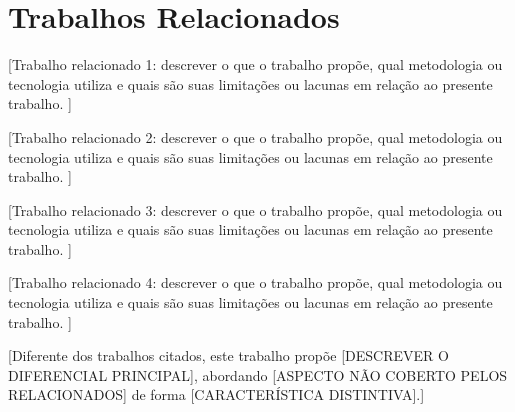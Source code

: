\section{Trabalhos Relacionados}
\label{sec:trabalhos}

[Trabalho relacionado 1: descrever o que o trabalho propõe, qual metodologia ou tecnologia
utiliza e quais são suas limitações ou lacunas em relação ao presente trabalho. \cite{rel1}]

[Trabalho relacionado 2: descrever o que o trabalho propõe, qual metodologia ou tecnologia
utiliza e quais são suas limitações ou lacunas em relação ao presente trabalho. \cite{rel2}]

[Trabalho relacionado 3: descrever o que o trabalho propõe, qual metodologia ou tecnologia
utiliza e quais são suas limitações ou lacunas em relação ao presente trabalho. \cite{rel3}]

[Trabalho relacionado 4: descrever o que o trabalho propõe, qual metodologia ou tecnologia
utiliza e quais são suas limitações ou lacunas em relação ao presente trabalho. \cite{rel4}]

[Diferente dos trabalhos citados, este trabalho propõe [DESCREVER O DIFERENCIAL PRINCIPAL],
abordando [ASPECTO NÃO COBERTO PELOS RELACIONADOS] de forma [CARACTERÍSTICA DISTINTIVA].]
